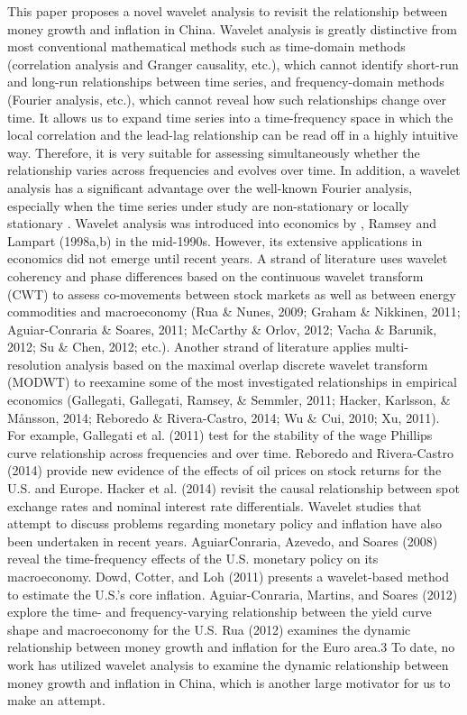 \documentclass[a4paper,fleqn]{cas-sc}
\begin{document}
This paper proposes a novel wavelet analysis to revisit the relationship between money growth and inflation in China. Wavelet analysis is greatly distinctive from most conventional mathematical methods such as time-domain methods (correlation analysis and Granger causality, etc.), which cannot identify short-run and long-run relationships between time series, and frequency-domain methods (Fourier analysis, etc.), which cannot reveal how such relationships change over time. It allows us to expand time series into a time-frequency space in which the local correlation and the lead-lag relationship can be read off in a highly intuitive way. Therefore, it is very suitable for assessing simultaneously whether the relationship varies across frequencies and evolves over time. In addition, a wavelet analysis has a significant advantage over the well-known Fourier analysis, especially when the time series under study are non-stationary or locally stationary \cite{ROUEFF2011813}.
Wavelet analysis was introduced into economics by \cite{Goffe1994}, Ramsey and Lampart (1998a,b) in the mid-1990s. However, its extensive applications in economics did not emerge until recent years. A strand of literature uses wavelet coherency and phase differences based on the continuous wavelet transform (CWT) to assess co-movements between stock markets as well as between energy commodities and macroeconomy (Rua \& Nunes, 2009; Graham \& Nikkinen, 2011; Aguiar-Conraria \& Soares, 2011; McCarthy \& Orlov, 2012; Vacha \& Barunik, 2012; Su \& Chen, 2012; etc.). Another strand of literature applies multi-resolution analysis based on the maximal overlap discrete wavelet transform (MODWT) to reexamine some of the most investigated relationships in empirical economics (Gallegati, Gallegati, Ramsey, \& Semmler, 2011; Hacker, Karlsson, \& Månsson, 2014; Reboredo \& Rivera-Castro, 2014; Wu \& Cui, 2010; Xu, 2011). For example, Gallegati et al. (2011) test for the stability of the wage Phillips curve relationship across frequencies and over time. Reboredo and Rivera-Castro (2014) provide new evidence of the effects of oil prices on stock returns for the U.S. and Europe. Hacker et al. (2014) revisit the causal relationship between spot exchange rates and nominal interest rate differentials. Wavelet studies that attempt to discuss problems regarding monetary policy and inflation have also been undertaken in recent years. AguiarConraria, Azevedo, and Soares (2008) reveal the time-frequency effects of the U.S. monetary policy on its macroeconomy. Dowd, Cotter, and Loh (2011) presents a wavelet-based method to estimate the U.S.'s core inflation. Aguiar-Conraria, Martins, and Soares (2012) explore the time- and frequency-varying relationship between the yield curve shape and macroeconomy for the U.S. Rua (2012) examines the dynamic relationship between money growth and inflation for the Euro area.3 To date, no work has utilized wavelet analysis to examine the dynamic relationship between money growth and inflation in China, which is another large motivator for us to make an attempt.
\end{document}
